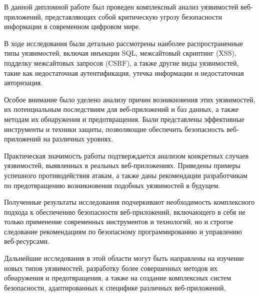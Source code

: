 \documentclass[a4paper,12pt]{diplom}
\begin{document}
	
	В данной дипломной работе был проведен комплексный анализ уязвимостей веб-приложений, представляющих собой критическую угрозу безопасности информации в современном цифровом мире. 
	
	В ходе исследования были детально рассмотрены наиболее распространенные типы уязвимостей, включая инъекции SQL, межсайтовый скриптинг (XSS), подделку межсайтовых запросов (CSRF), а также другие виды уязвимостей, такие как недостаточная аутентификация, утечка информации и недостаточная авторизация.  
	
	Особое внимание было уделено анализу причин возникновения этих уязвимостей, их потенциальным последствиям для веб-приложений и баз данных, а также методам их обнаружения и предотвращения. Были представлены  эффективные инструменты и техники защиты, позволяющие обеспечить безопасность веб-приложений на различных уровнях.
	
	Практическая значимость работы подтверждается анализом конкретных случаев уязвимостей, выявленных в реальных веб-приложениях. Приведены примеры успешного противодействия атакам, а также даны рекомендации разработчикам по предотвращению возникновения подобных уязвимостей в будущем. 
	
	Полученные результаты исследования подчеркивают необходимость комплексного подхода к обеспечению безопасности веб-приложений, включающего в себя не только применение современных инструментов и технологий, но и строгое следование рекомендациям по безопасному программированию и управлению веб-ресурсами.
	
	Дальнейшие исследования в этой области могут быть направлены на изучение новых типов уязвимостей, разработку более совершенных методов их обнаружения и предотвращения, а также на создание комплексных систем безопасности, адаптированных к специфике различных веб-приложений.
	
	
	
	
	
	
	\renewcommand\bibname{Список литературы}
	
	
	
	
	
\end{document}
